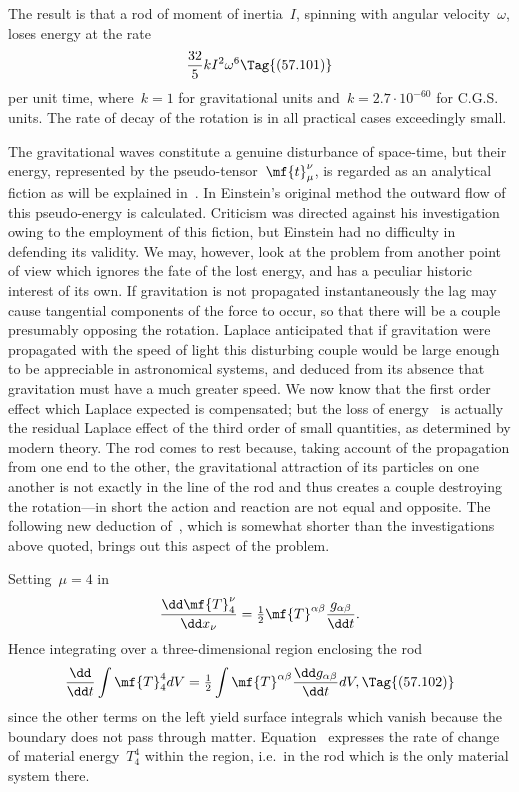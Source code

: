 \documentclass[12pt]{book}
\begin{document}
The result is that a rod of moment of inertia~$I$, spinning with angular velocity~$\omega$, loses energy at the rate
\[
\frac{32}{5} k I^2 \omega^6
\Tag{(57.101)}
\]
per unit time, where~$k = 1$ for gravitational units and~$k=2.7\cdot10^{-60}$ for C.G.S. units.
The rate of decay of the rotation is in all practical cases exceedingly small.

The gravitational waves constitute a genuine disturbance of space-time, but their energy, represented by the
pseudo\hyp{}tensor~$\mf{t}^\nu_\mu$, is regarded as an analytical fiction as will be explained in~.
In Einstein's original method the outward flow of this pseudo\hyp{}energy is calculated.
Criticism was directed against his investigation owing to the employment of this fiction,
but Einstein had no difficulty in defending its validity.
We may, however, look at the problem from another point of view which ignores the fate of the lost energy,
and has a peculiar historic interest of its own.
If gravitation is not propagated instantaneously the lag may cause tangential components of the force to occur,
so that there will be a couple presumably opposing the rotation.
 Laplace anticipated that if gravitation were propagated with the speed of light this disturbing couple
would be large enough to be appreciable in astronomical systems, and deduced from its absence that gravitation
must have a much greater speed.
We now know that the first order effect which Laplace expected is compensated;
but the loss of energy~ is actually the residual Laplace effect of the third order of small quantities,
as determined by modern theory.
The rod comes to rest because, taking account of the propagation from one end to the other,
the gravitational attraction of its particles on one another is not exactly in the line of the rod and thus
creates a couple destroying the rotation---in short the action and reaction are not equal and opposite.
The following new deduction of~, which is somewhat shorter than the investigations above quoted,
brings out this aspect of the problem.

Setting~$\mu=4$ in~
\[
\frac{\dd\mf{T}^\nu_4}{\dd x_\nu} = \tfrac{1}{2}\mf{T}^{\alpha\beta}\frac{g_{\alpha\beta}}{\dd t}.
\]
Hence integrating over a three\hyp{}dimensional region enclosing the rod
\[
\frac{\dd}{\dd t} \int\mf{T}^4_4 dV = \tfrac{1}{2}\int\mf{T}^{\alpha\beta}\frac{\dd g_{\alpha\beta}}{\dd t} dV,
\Tag{(57.102)}
\]
since the other terms on the left yield surface integrals which vanish because the boundary does not pass through
matter.
Equation~ expresses the rate of change of material energy~$T^4_4$ within the region,
i.e.\ in the rod which is the only material system there.
\end{document}
